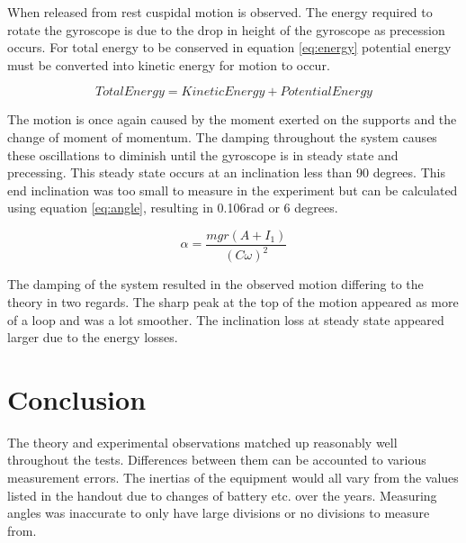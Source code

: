 \documentclass[twoside,twocolumn]{article}
\begin{document}
When released from rest cuspidal motion is observed. The energy required to rotate the gyroscope is due to the drop in height of the gyroscope as precession occurs. For total energy to be conserved in equation \ref{eq:energy} potential energy must be converted into kinetic energy for motion to occur.

\begin{equation}
\label{eq:energy}
Total Energy = Kinetic Energy + Potential Energy 
\end{equation} 

The motion is once again caused by the moment exerted on the supports and the change of moment of momentum. The damping throughout the system causes these oscillations to diminish until the gyroscope is in steady state and precessing. This steady state occurs at an inclination less than 90 degrees. This end inclination was too small to measure in the experiment but can be calculated using equation \ref{eq:angle}, resulting in 0.106rad or 6 degrees.

\begin{equation}
\label{eq:angle}
\alpha = \frac{mgr(A+I_1)}{(C\omega)^2}
\end{equation} 

The damping of the system resulted in the observed motion differing to the theory in two regards. The sharp peak at the top of the motion appeared as more of a loop and was a lot smoother. The inclination loss at steady state appeared larger due to the energy losses.
\section{Conclusion}
The theory and experimental observations matched up reasonably well throughout the tests. Differences between them can be accounted to various measurement errors. The inertias of the equipment would all vary from the values listed in the handout due to changes of battery etc. over the years.  Measuring angles was inaccurate to only have large divisions or no divisions to measure from. 


\end{document}
